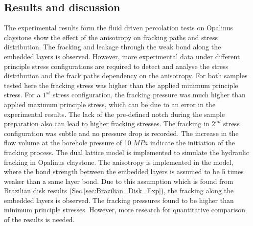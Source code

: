 \subsection{Results and discussion}
The experimental results form the fluid driven percolation tests on Opalinus claystone show the effect of the anisotropy on fracking paths and stress distribution. The fracking and leakage through the weak bond along the embedded layers is observed. However, more experimental data under different principle stress configurations are required to detect and analyse the stress distribution and the frack paths dependency on the anisotropy. For both samples tested here the fracking stress was higher than the applied minimum principle stress. For a $1^{st}$ stress configuration, the fracking pressure was much higher than applied maximum principle stress, which can be due to an error in the experimental results. The lack of the pre-defined notch during the sample preparation also can lead to higher fracking stresses. The fracking in $2^{nd}$ stress configuration was subtle and no pressure drop is recorded. The increase in the flow volume at the borehole pressure of 10 $MPa$ indicate the initiation of the fracking process. The dual lattice model is implemented to simulate the hydraulic fracking in Opalinus claystone. The anisotropy is implemented in the model, where the bond strength between the embedded layers is assumed to be 5 times weaker than a same layer bond. Due to this assumption which is found from Brazilian disk results (Sec.\ref{sec:Brazilian_Disk_Exp}), the fracking along the embedded layers is observed. The fracking pressures found to be higher than minimum principle stresses. However, more research for quantitative comparison of the results is needed. 


